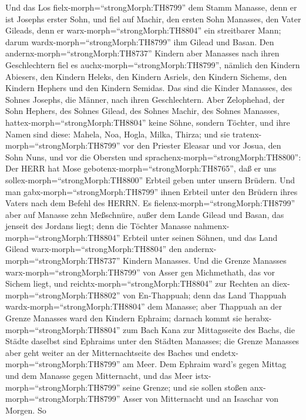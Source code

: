  Und das Los fielx-morph=``strongMorph:TH8799'' dem Stamm
Manasse, denn er ist Josephs erster Sohn, und fiel auf Machir, den
ersten Sohn Manasses, den Vater Gileads, denn er
warx-morph=``strongMorph:TH8804'' ein streitbarer Mann; darum
wardx-morph=``strongMorph:TH8799'' ihm Gilead und Basan. 
Den andernx-morph=``strongMorph:TH8737'' Kindern aber Manasses nach
ihren Geschlechtern fiel es auchx-morph=``strongMorph:TH8799'', nämlich
den Kindern Abiesers, den Kindern Heleks, den Kindern Asriels, den
Kindern Sichems, den Kindern Hephers und den Kindern Semidas. Das sind
die Kinder Manasses, des Sohnes Josephs, die Männer, nach ihren
Geschlechtern.  Aber Zelophehad, der Sohn Hephers, des
Sohnes Gilead, des Sohnes Machir, des Sohnes Manasses,
hattex-morph=``strongMorph:TH8804'' keine Söhne, sondern Töchter, und
ihre Namen sind diese: Mahela, Noa, Hogla, Milka, Thirza; 
und sie tratenx-morph=``strongMorph:TH8799'' vor den Priester Eleasar
und vor Josua, den Sohn Nuns, und vor die Obersten und
sprachenx-morph=``strongMorph:TH8800'': Der HERR hat Mose
gebotenx-morph=``strongMorph:TH8765'', daß er uns
sollex-morph=``strongMorph:TH8800'' Erbteil geben unter unsern Brüdern.
Und man gabx-morph=``strongMorph:TH8799'' ihnen Erbteil unter den
Brüdern ihres Vaters nach dem Befehl des HERRN.  Es
fielenx-morph=``strongMorph:TH8799'' aber auf Manasse zehn Meßschnüre,
außer dem Lande Gilead und Basan, das jenseit des Jordans liegt;
 denn die Töchter Manasse
nahmenx-morph=``strongMorph:TH8804'' Erbteil unter seinen Söhnen, und
das Land Gilead warx-morph=``strongMorph:TH8804'' den
andernx-morph=``strongMorph:TH8737'' Kindern Manasses.  Und
die Grenze Manasses warx-morph=``strongMorph:TH8799'' von Asser gen
Michmethath, das vor Sichem liegt, und
reichtx-morph=``strongMorph:TH8804'' zur Rechten an
diex-morph=``strongMorph:TH8802'' von En-Thappuah;  denn das
Land Thappuah wardx-morph=``strongMorph:TH8804'' dem Manasse; aber
Thappuah an der Grenze Manasses ward den Kindern Ephraim; 
darnach kommt sie herabx-morph=``strongMorph:TH8804'' zum Bach Kana zur
Mittagsseite des Bachs, die Städte daselbst sind Ephraims unter den
Städten Manasses; die Grenze Manasses aber geht weiter an der
Mitternachtseite des Baches und endetx-morph=``strongMorph:TH8799'' am
Meer.  Dem Ephraim ward's gegen Mittag und dem Manasse
gegen Mitternacht, und das Meer istx-morph=``strongMorph:TH8799'' seine
Grenze; und sie sollen stoßen anx-morph=``strongMorph:TH8799'' Asser von
Mitternacht und an Isaschar von Morgen.  So

